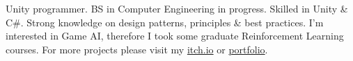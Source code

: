 

\begin{cvparagraph}

Unity programmer. BS in Computer Engineering in progress. Skilled in Unity \& C\#. Strong knowledge on design patterns, principles \& best practices. I'm interested in Game AI, therefore I took some graduate Reinforcement Learning courses. For more projects please visit my \href{https://null3rror.itch.io/}{\color{blue}itch.io} or \href{http://null3rror.github.io/Portfolio/}{\color{blue}portfolio}. 
\end{cvparagraph}
